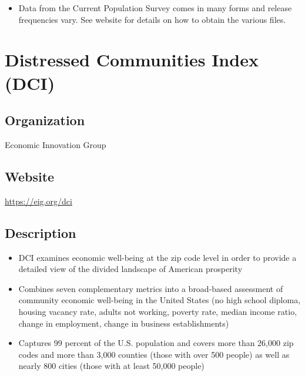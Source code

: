 \documentclass[
]{book}
\providecommand{\tightlist}{%
  \setlength{\itemsep}{0pt}\setlength{\parskip}{0pt}}
\begin{document}
\begin{itemize}
\tightlist
\item
  Data from the Current Population Survey comes in many forms and release frequencies vary. See website for details on how to obtain the various files.
\end{itemize}

\mainmatter

\hypertarget{distressed-communities-index-dci}{%
\chapter{Distressed Communities Index (DCI)}\label{distressed-communities-index-dci}}

\hypertarget{organization-23}{%
\section{Organization}\label{organization-23}}

Economic Innovation Group

\hypertarget{website-23}{%
\section{Website}\label{website-23}}

\url{https://eig.org/dci}

\hypertarget{description-23}{%
\section{Description}\label{description-23}}

\begin{itemize}
\tightlist
\item
  DCI examines economic well-being at the zip code level in order to provide a detailed view of the divided landscape of American prosperity
\item
  Combines seven complementary metrics into a broad-based assessment of community economic well-being in the United States (no high school diploma, housing vacancy rate, adults not working, poverty rate, median income ratio, change in employment, change in business establishments)
\item
  Captures 99 percent of the U.S. population and covers more than 26,000 zip codes and more than 3,000 counties (those with over 500 people) as well as nearly 800 cities (those with at least 50,000 people)
\end{itemize}
\end{document}
